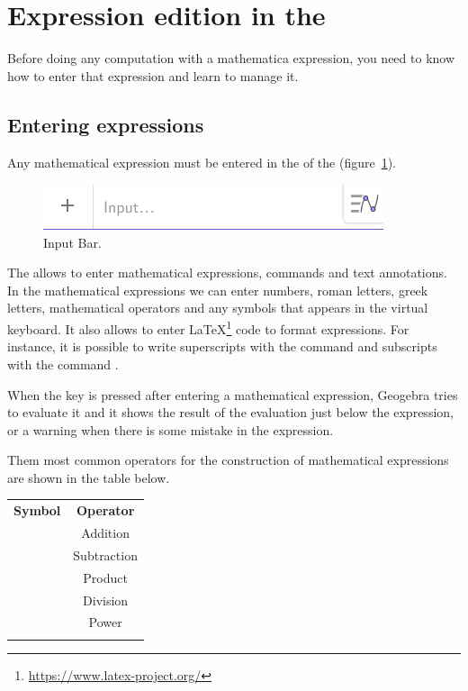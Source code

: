 \section{Expression edition in the }
Before doing any computation with a mathematica expression, you need to know how to enter that expression and learn to manage it.


\subsection*{Entering expressions}
Any mathematical expression must be entered in the  of the  (figure~\ref{g:input-bar}).

\begin{figure}[h!]
\begin{center}
\includegraphics[scale=0.6]{img/introduction/input-bar}
\caption{Input Bar.} \label{g:input-bar}
\end{center}
\end{figure}

The  allows to enter mathematical expressions, commands and text annotations.
In the mathematical expressions we can enter numbers, roman letters, greek letters, mathematical operators and any symbols that appears in the virtual keyboard.
It also allows to enter \LaTeX\footnote{\url{https://www.latex-project.org/}} code to format expressions.
For instance, it is possible to write superscripts with the command \command{\^{}} and subscripts with the command \command{\_}.

When the key  is pressed after entering a mathematical expression, Geogebra tries to evaluate it and it shows the result of the evaluation just below the expression, or a warning when there is some mistake in the expression.

Them most common operators for the construction of mathematical expressions are shown in the table below.

\begin{center}
\begin{tabular}{cc}
\tcrule
\textbf{Symbol} & \textbf{Operator} \\
\command{+}     & Addition          \\
\command{-}     & Subtraction       \\
\command{*}     & Product           \\
\command{/}     & Division          \\
\command{\^{}}  & Power             \\
\bcrule
\end{tabular}
\end{center}

